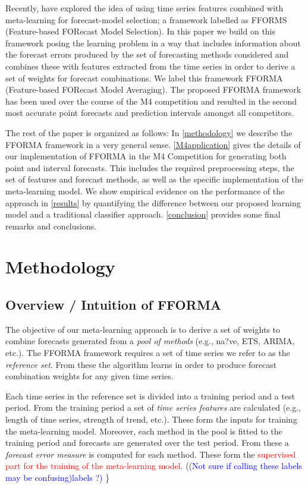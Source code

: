 \documentclass[11pt,a4paper,]{article}
\theoremstyle{definition}
\theoremstyle{definition}
\theoremstyle{definition}
\theoremstyle{remark}
\begin{document}
Recently, \textcite{fforms} have explored the idea of using time series
features combined with meta-learning for forecast-model selection; a
framework labelled as FFORMS (Feature-based FORecast Model Selection).
In this paper we build on this framework posing the learning problem in
a way that includes information about the forecast errors produced by
the set of forecasting methods considered and combines these with
features extracted from the time series in order to derive a set of
weights for forecast combinations. We label this framework FFORMA
(Feature-based FORecast Model Averaging). The proposed FFORMA framework
has been used over the course of the M4 competition and resulted in the
second most accurate point forecasts and prediction intervals amongst
all competitors.

The rest of the paper is organized as follows: In \autoref{methodology}
we describe the FFORMA framework in a very general sense.
\autoref{M4application} gives the details of our implementation of
FFORMA in the M4 Competition for generating both point and interval
forecasts. This includes the required preprocessing steps, the set of
features and forecast methods, as well as the specific implementation of
the meta-learning model. We show empirical evidence on the performance
of the approach in \autoref{results} by quantifying the difference
between our proposed learning model and a traditional classifier
approach. \autoref{conclusion} provides some final remarks and
conclusions.

\section{Methodology}\label{methodology}

\subsection{Overview / Intuition of
FFORMA}\label{overview-intuition-of-fforma}

The objective of our meta-learning approach is to derive a set of
weights to combine forecasts generated from a \emph{pool of methods}
(e.g., na?ve, ETS, ARIMA, etc.). The FFORMA framework requires a set of
time series we refer to as the \emph{reference set}. From these the
algorithm learns in order to produce forecast combination weights for
any given time series.

Each time series in the reference set is divided into a training period
and a test period. From the training period a set of \emph{time series
features} are calculated (e.g., length of time series, strength of
trend, etc.). These form the inputs for training the meta-learning
model. Moreover, each method in the pool is fitted to the training
period and forecasts are generated over the test period. From these a
\emph{forecast error measure} is computed for each method. These form
the
\textcolor{red}{ supervised part for the training of the meta-learning model.}
(\textcolor{blue}{(Not sure if calling these labels may be confusing)labels ?)}
\}
\end{document}
